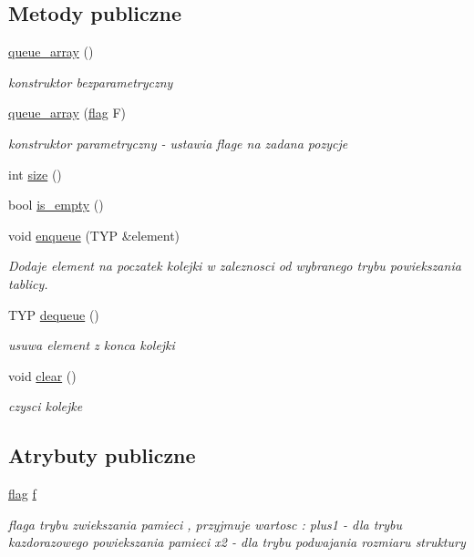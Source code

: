 \subsection*{\-Metody publiczne}
\begin{DoxyCompactItemize}
\item 
\hyperlink{classqueue__array_af651ba1c08e777af1ef23d1301819c58}{queue\-\_\-array} ()
\begin{DoxyCompactList}\small\item\em konstruktor bezparametryczny \end{DoxyCompactList}\item 
\hyperlink{classqueue__array_ad2c9f7906fad18d3daad605455210cb8}{queue\-\_\-array} (\hyperlink{stos_8hh_a7847560c748814fd3070e9149a9578bd}{flag} \-F)
\begin{DoxyCompactList}\small\item\em konstruktor parametryczny -\/ ustawia flage na zadana pozycje \end{DoxyCompactList}\item 
int \hyperlink{classqueue__array_a423093872e5cf4eb99f17ca1179ffa70}{size} ()
\item 
bool \hyperlink{classqueue__array_aa6ddf8e684f31a34f721e89ea83a7469}{is\-\_\-empty} ()
\item 
void \hyperlink{classqueue__array_afaaab546cbad8250a5f9bdb481a1fb9d}{enqueue} (\-T\-Y\-P \&element)
\begin{DoxyCompactList}\small\item\em \-Dodaje element na poczatek kolejki w zaleznosci od wybranego trybu powiekszania tablicy. \end{DoxyCompactList}\item 
\-T\-Y\-P \hyperlink{classqueue__array_a67a036da416c976652c9039e5e101538}{dequeue} ()
\begin{DoxyCompactList}\small\item\em usuwa element z konca kolejki \end{DoxyCompactList}\item 
void \hyperlink{classqueue__array_acfe3b3e3ed5cc3b380d3f0d261ade3d9}{clear} ()
\begin{DoxyCompactList}\small\item\em czysci kolejke \end{DoxyCompactList}\end{DoxyCompactItemize}
\subsection*{\-Atrybuty publiczne}
\begin{DoxyCompactItemize}
\item 
\hyperlink{stos_8hh_a7847560c748814fd3070e9149a9578bd}{flag} \hyperlink{classqueue__array_a01c734086cf5e56c719b4d327cc36664}{f}
\begin{DoxyCompactList}\small\item\em flaga trybu zwiekszania pamieci , przyjmuje wartosc \-: plus1 -\/ dla trybu kazdorazowego powiekszania pamieci x2 -\/ dla trybu podwajania rozmiaru struktury \end{DoxyCompactList}\end{DoxyCompactItemize}
